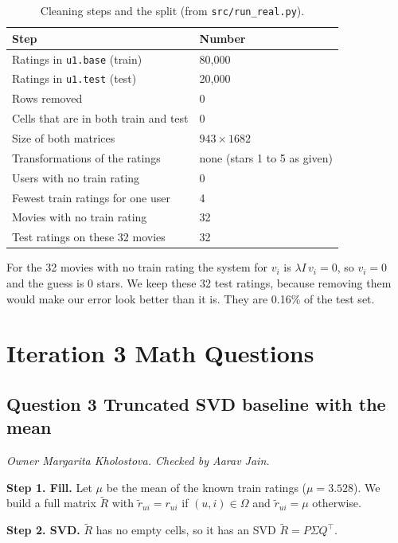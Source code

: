 \begin{table}[h]
\centering
\begin{tabular}{ll}
\hline
Step & Number \\
\hline
Ratings in \texttt{u1.base} (train) & 80{,}000 \\
Ratings in \texttt{u1.test} (test) & 20{,}000 \\
Rows removed & 0 \\
Cells that are in both train and test & 0 \\
Size of both matrices & $943 \times 1682$ \\
Transformations of the ratings & none (stars 1 to 5 as given) \\
Users with no train rating & 0 \\
Fewest train ratings for one user & 4 \\
Movies with no train rating & 32 \\
Test ratings on these 32 movies & 32 \\
\hline
\end{tabular}
\caption{Cleaning steps and the split (from \texttt{src/run\_real.py}).}
\label{tab:clean}
\end{table}

For the 32 movies with no train rating the system for $v_i$ is $\lambda I\, v_i = 0$, so $v_i = 0$ and the guess is 0 stars. We keep these 32 test ratings, because removing them would make our error look better than it is. They are 0.16\% of the test set.

\section{Iteration 3 Math Questions}

\subsection*{Question 3 Truncated SVD baseline with the mean}
\textit{Owner Margarita Kholostova. Checked by Aarav Jain.}

\textbf{Step 1. Fill.} Let $\mu$ be the mean of the known train ratings ($\mu = 3.528$). We build a full matrix $\tilde R$ with $\tilde r_{ui} = r_{ui}$ if $(u,i) \in \Omega$ and $\tilde r_{ui} = \mu$ otherwise.

\textbf{Step 2. SVD.} $\tilde R$ has no empty cells, so it has an SVD $\tilde R = P \Sigma Q^\top$.

